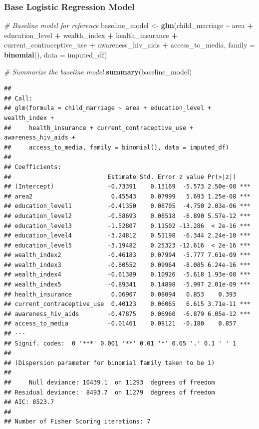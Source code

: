 \documentclass[
]{article}
\newenvironment{Shaded}{\begin{snugshade}}{\end{snugshade}}
\newcommand{\AttributeTok}[1]{\textcolor[rgb]{0.13,0.29,0.53}{#1}}
\newcommand{\CommentTok}[1]{\textcolor[rgb]{0.56,0.35,0.01}{\textit{#1}}}
\newcommand{\FunctionTok}[1]{\textcolor[rgb]{0.13,0.29,0.53}{\textbf{#1}}}
\newcommand{\NormalTok}[1]{#1}
\newcommand{\OtherTok}[1]{\textcolor[rgb]{0.56,0.35,0.01}{#1}}
\newcommand{\SpecialCharTok}[1]{\textcolor[rgb]{0.81,0.36,0.00}{\textbf{#1}}}
\begin{document}
\hypertarget{base-logistic-regression-model}{%
\subsubsection{Base Logistic Regression
Model}\label{base-logistic-regression-model}}

\begin{Shaded}
\begin{Highlighting}[]
\CommentTok{\# Baseline model for reference}
\NormalTok{baseline\_model }\OtherTok{\textless{}{-}} \FunctionTok{glm}\NormalTok{(child\_marriage }\SpecialCharTok{\textasciitilde{}}\NormalTok{ area }\SpecialCharTok{+}\NormalTok{ education\_level }\SpecialCharTok{+}\NormalTok{ wealth\_index }\SpecialCharTok{+}\NormalTok{ health\_insurance }\SpecialCharTok{+}\NormalTok{ current\_contraceptive\_use }\SpecialCharTok{+}\NormalTok{ awareness\_hiv\_aids }\SpecialCharTok{+}\NormalTok{ access\_to\_media, }\AttributeTok{family =} \FunctionTok{binomial}\NormalTok{(), }\AttributeTok{data =}\NormalTok{ imputed\_df)}

\CommentTok{\# Summarize the baseline model}
\FunctionTok{summary}\NormalTok{(baseline\_model)}
\end{Highlighting}
\end{Shaded}

\begin{verbatim}
## 
## Call:
## glm(formula = child_marriage ~ area + education_level + wealth_index + 
##     health_insurance + current_contraceptive_use + awareness_hiv_aids + 
##     access_to_media, family = binomial(), data = imputed_df)
## 
## Coefficients:
##                           Estimate Std. Error z value Pr(>|z|)    
## (Intercept)               -0.73391    0.13169  -5.573 2.50e-08 ***
## area2                      0.45543    0.07999   5.693 1.25e-08 ***
## education_level1          -0.41350    0.08705  -4.750 2.03e-06 ***
## education_level2          -0.58693    0.08518  -6.890 5.57e-12 ***
## education_level3          -1.52807    0.11502 -13.286  < 2e-16 ***
## education_level4          -3.24812    0.51198  -6.344 2.24e-10 ***
## education_level5          -3.19482    0.25323 -12.616  < 2e-16 ***
## wealth_index2             -0.46183    0.07994  -5.777 7.61e-09 ***
## wealth_index3             -0.80552    0.09964  -8.085 6.24e-16 ***
## wealth_index4             -0.61389    0.10926  -5.618 1.93e-08 ***
## wealth_index5             -0.89341    0.14898  -5.997 2.01e-09 ***
## health_insurance           0.06907    0.08094   0.853    0.393    
## current_contraceptive_use  0.40123    0.06065   6.615 3.71e-11 ***
## awareness_hiv_aids        -0.47875    0.06960  -6.879 6.05e-12 ***
## access_to_media           -0.01461    0.08121  -0.180    0.857    
## ---
## Signif. codes:  0 '***' 0.001 '**' 0.01 '*' 0.05 '.' 0.1 ' ' 1
## 
## (Dispersion parameter for binomial family taken to be 1)
## 
##     Null deviance: 10439.1  on 11293  degrees of freedom
## Residual deviance:  8493.7  on 11279  degrees of freedom
## AIC: 8523.7
## 
## Number of Fisher Scoring iterations: 7
\end{verbatim}
\end{document}
